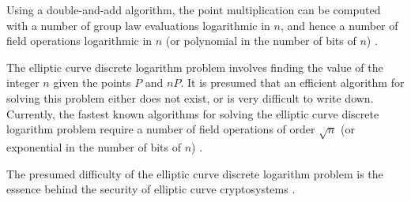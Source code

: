 Using a double-and-add algorithm, the point multiplication can be computed with a number of group law evaluations logarithmic in $n$, and hence a number of field operations logarithmic in $n$ (or polynomial in the number of bits of $n$) \citep{book:Arithmetic}.

The elliptic curve discrete logarithm problem involves finding the value of the integer $n$ given the points $P$ and $nP$. It is presumed that an efficient algorithm for solving this problem either does not exist, or is very difficult to write down. Currently, the fastest known algorithms for solving the elliptic curve discrete logarithm problem require a number of field operations of order $\sqrt{n}$ (or exponential in the number of bits of $n$) \citep{book:Arithmetic}.

The presumed difficulty of the elliptic curve discrete logarithm problem is the essence behind the security of elliptic curve cryptosystems \citep{book:Arithmetic,book:Koblitz}.

